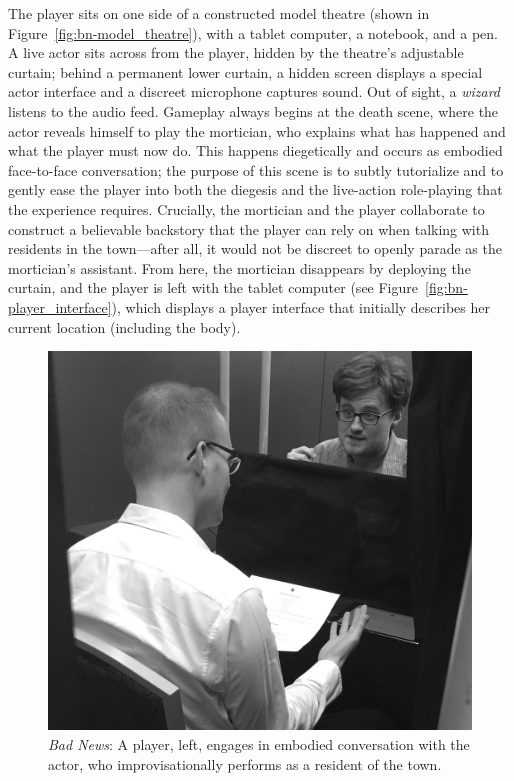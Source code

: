 \documentclass[letterpaper]{article}
\begin{document}
The player sits on one side of a constructed model theatre (shown in Figure~\ref{fig:bn-model_theatre}), with a tablet computer, a notebook, and a pen. A live actor sits across from the player, hidden by the theatre's adjustable curtain; behind a permanent lower curtain, a hidden screen displays a special actor interface and a discreet microphone captures sound. Out of sight, a \textit{wizard} listens to the audio feed. Gameplay always begins at the death scene, where the actor reveals himself to play the mortician, who explains what has happened and what the player must now do. This happens diegetically and occurs as embodied face-to-face conversation; the purpose of this scene is to subtly tutorialize and to gently ease the player into both the diegesis and the live-action role-playing that the experience requires. Crucially, the mortician and the player collaborate to construct a believable backstory that the player can rely on when talking with residents in the town---after all, it would not be discreet to openly parade as the mortician's assistant. From here, the mortician disappears by deploying the curtain, and the player is left with the tablet computer (see Figure~\ref{fig:bn-player_interface}), which displays a player interface that initially describes her current location (including the body).

\begin{figure}[t]
  \centering
  \includegraphics[width=0.8\columnwidth]{images/bad_news-player_and_actor}
  \caption{\textit{Bad News}: A player, left, engages in embodied conversation with the actor, who improvisationally performs as a resident of the town.}
  \label{fig:bn-player_and_actor}
\end{figure}
\end{document}
